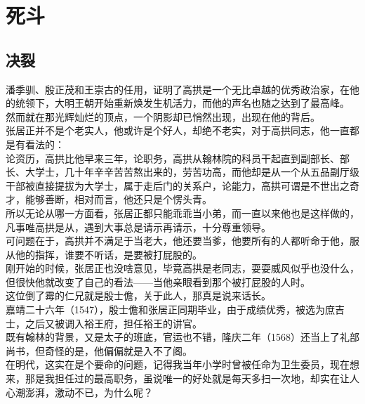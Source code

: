 \section{死斗}
\ifnum{}
	\begin{multicols}{\theparacolNo}
\fi
\subsection{决裂}
潘季驯、殷正茂和王崇古的任用，证明了高拱是一个无比卓越的优秀政治家，在他的统领下，大明王朝开始重新焕发生机活力，而他的声名也随之达到了最高峰。\\

然而就在那光辉灿烂的顶点，一个阴影却已悄然出现，出现在他的背后。\\

张居正并不是个老实人，他或许是个好人，却绝不老实，对于高拱同志，他一直都是有看法的：\\

论资历，高拱比他早来三年，论职务，高拱从翰林院的科员干起直到副部长、部长、大学士，几十年辛辛苦苦熬出来的，劳苦功高，而他却是从一个从五品副厅级干部被直接提拔为大学士，属于走后门的关系户，论能力，高拱可谓是不世出之奇才，能够善断，相对而言，他还只是个愣头青。\\

所以无论从哪一方面看，张居正都只能乖乖当小弟，而一直以来他也是这样做的，凡事唯高拱是从，遇到大事总是请示再请示，十分尊重领导。\\

可问题在于，高拱并不满足于当老大，他还要当爹，他要所有的人都听命于他，服从他的指挥，谁要不听话，是要被打屁股的。\\

刚开始的时候，张居正也没啥意见，毕竟高拱是老同志，耍耍威风似乎也没什么，但很快他就改变了自己的看法——当他亲眼看到那个被打屁股的人时。\\

这位倒了霉的仁兄就是殷士儋，关于此人，那真是说来话长。\\

嘉靖二十六年（1547），殷士儋和张居正同期毕业，由于成绩优秀，被选为庶吉士，之后又被调入裕王府，担任裕王的讲官。\\

既有翰林的背景，又是太子的班底，官运也不错，隆庆二年（1568）还当上了礼部尚书，但奇怪的是，他偏偏就是入不了阁。\\

在明代，这实在是个要命的问题，记得我当年小学时曾被任命为卫生委员，现在想来，那是我担任过的最高职务，虽说唯一的好处就是每天多扫一次地，却实在让人心潮澎湃，激动不已，为什么呢？\\


\end{multicols}
